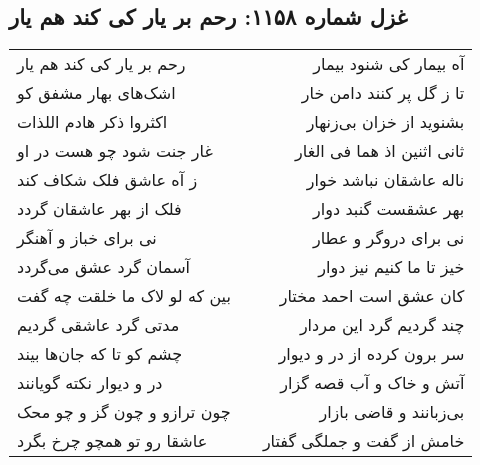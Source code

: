 \begin{center}
\section*{غزل شماره ۱۱۵۸: رحم بر یار کی کند هم یار}
\label{sec:1158}
\begin{longtable}{l p{0.5cm} r}
رحم بر یار کی کند هم یار
&&
آه بیمار کی شنود بیمار
\\
اشک‌های بهار مشفق کو
&&
تا ز گل پر کنند دامن خار
\\
اکثروا ذکر هادم اللذات
&&
بشنوید از خزان بی‌زنهار
\\
غار جنت شود چو هست در او
&&
ثانی اثنین اذ هما فی الغار
\\
ز آه عاشق فلک شکاف کند
&&
ناله عاشقان نباشد خوار
\\
فلک از بهر عاشقان گردد
&&
بهر عشقست گنبد دوار
\\
نی برای خباز و آهنگر
&&
نی برای دروگر و عطار
\\
آسمان گرد عشق می‌گردد
&&
خیز تا ما کنیم نیز دوار
\\
بین که لو لاک ما خلقت چه گفت
&&
کان عشق است احمد مختار
\\
مدتی گرد عاشقی گردیم
&&
چند گردیم گرد این مردار
\\
چشم کو تا که جان‌ها بیند
&&
سر برون کرده از در و دیوار
\\
در و دیوار نکته گویانند
&&
آتش و خاک و آب قصه گزار
\\
چون ترازو و چون گز و چو محک
&&
بی‌زبانند و قاضی بازار
\\
عاشقا رو تو همچو چرخ بگرد
&&
خامش از گفت و جملگی گفتار
\\
\end{longtable}
\end{center}
